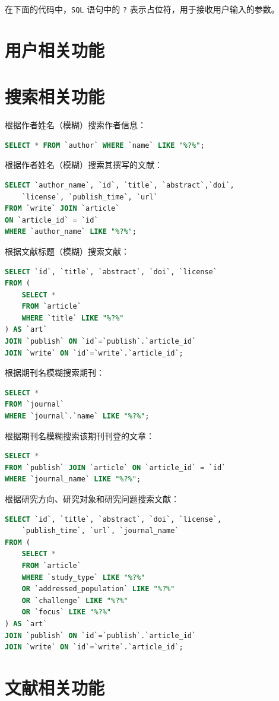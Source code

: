 \documentclass[UTF8,openany]{ctexbook}
\begin{document}
在下面的代码中，\texttt{SQL} 语句中的 \texttt{?} 表示占位符，用于接收用户输入的参数。

\section{用户相关功能}

\section{搜索相关功能}

根据作者姓名（模糊）搜索作者信息：

\begin{lstlisting}[language=sql]
SELECT * FROM `author` WHERE `name` LIKE "%?%";
\end{lstlisting}

根据作者姓名（模糊）搜索其撰写的文献：

\begin{lstlisting}[language=sql]
SELECT `author_name`, `id`, `title`, `abstract`,`doi`,
    `license`, `publish_time`, `url` 
FROM `write` JOIN `article` 
ON `article_id` = `id` 
WHERE `author_name` LIKE "%?%";
\end{lstlisting}

根据文献标题（模糊）搜索文献：

\begin{lstlisting}[language=sql]
SELECT `id`, `title`, `abstract`, `doi`, `license`
FROM (
    SELECT * 
    FROM `article`
    WHERE `title` LIKE "%?%"
) AS `art`
JOIN `publish` ON `id`=`publish`.`article_id`
JOIN `write` ON `id`=`write`.`article_id`;
\end{lstlisting}

根据期刊名模糊搜索期刊：

\begin{lstlisting}[language=sql]
SELECT * 
FROM `journal` 
WHERE `journal`.`name` LIKE "%?%";
\end{lstlisting}

根据期刊名模糊搜索该期刊刊登的文章：
\begin{lstlisting}[language=sql]
SELECT * 
FROM `publish` JOIN `article` ON `article_id` = `id`
WHERE `journal_name` LIKE "%?%";
\end{lstlisting}

根据研究方向、研究对象和研究问题搜索文献：
\begin{lstlisting}[language=sql]
SELECT `id`, `title`, `abstract`, `doi`, `license`, 
    `publish_time`, `url`, `journal_name`
FROM (
    SELECT * 
    FROM `article`
    WHERE `study_type` LIKE "%?%"
    OR `addressed_population` LIKE "%?%"
    OR `challenge` LIKE "%?%"
    OR `focus` LIKE "%?%"
) AS `art`
JOIN `publish` ON `id`=`publish`.`article_id`
JOIN `write` ON `id`=`write`.`article_id`;
\end{lstlisting}

\section{文献相关功能}
\end{document}
